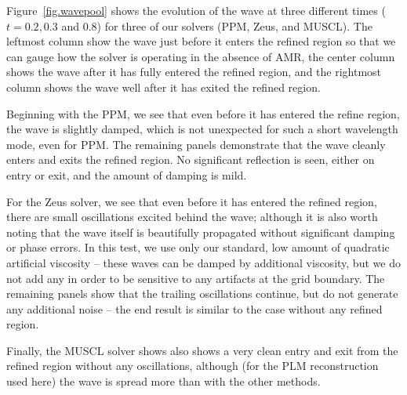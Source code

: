 Figure~\ref{fig.wavepool} shows the evolution of the wave at three different times ($t = 0.2, 0.3$ and 0.8) for three of our solvers (PPM, Zeus, and MUSCL).  The leftmost column show the wave just before it enters the refined region so that we can gauge how the solver is operating in the absence of AMR, the center column shows the wave after it has fully entered the refined region, and the rightmost column shows the wave well after it has exited the refined region.

Beginning with the PPM, we see that even before it has entered the refine region, the wave is slightly damped, which is not unexpected for such a short wavelength mode, even for PPM.  The remaining panels demonstrate that the wave cleanly enters and exits the refined region.  No significant reflection is seen, either on entry or exit, and the amount of damping is mild.

For the Zeus solver, we see that even before it has entered the refined region, there are small oscillations excited behind the wave; although it is also worth noting that the wave itself is beautifully propagated without significant damping or phase errors.  In this test, we use only our standard, low amount of quadratic artificial viscosity -- these waves can be damped by additional viscosity, but we do not add any in order to be sensitive to any artifacts at the grid boundary.  The remaining panels show that the trailing oscillations continue, but do not generate any additional noise -- the end result is similar to the case without any refined region.

Finally, the MUSCL solver shows also shows a very clean entry and exit from the refined region without any oscillations, although (for the PLM reconstruction used here) the wave is spread more than with the other methods.

